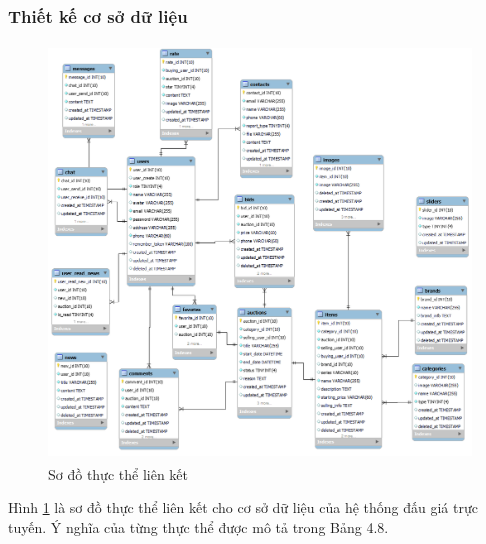 \documentclass{article}
\begin{document}
\subsubsection{Thiết kế cơ sở dữ liệu}
\begin{figure}[H]
    \centering
    \includegraphics[width=11.4cm,height=11.0cm]{images/database.png}
    \caption{Sơ đồ thực thể liên kết}
    \label{hinh413}
\end{figure}
Hình \ref{hinh413} là sơ đồ thực thể liên kết cho cơ sở dữ liệu của hệ thống đấu giá trực tuyến. Ý nghĩa của từng thực thể được mô tả trong Bảng 4.8.
    \tabletail{\hline}
    \label{bang48}
\end{document}
